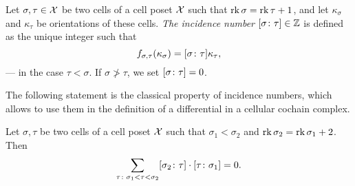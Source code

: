 \begin{defin}\label{definIncidenceNumber}
Let $\sigma,\tau\in \mathcal{X}$ be two cells of a cell poset $\mathcal{X}$ such that $\operatorname{rk}\sigma=\operatorname{rk}\tau+1$, and let $\kappa_\sigma$ and $\kappa_\tau$ be orientations of these cells. \emph{The incidence number} $[\sigma\colon \tau]\in\mathbb{Z}$ is defined as the unique integer such that
\[
f_{\sigma,\tau}(\kappa_\sigma)=[\sigma\colon \tau]\kappa_\tau,
\]
--- in the case $\tau<\sigma$. If $\sigma\ngtr \tau$, we set $[\sigma\colon \tau]=0$.
\end{defin}

The following statement is the classical property of incidence numbers, which allows to use them in the definition of a differential in a cellular cochain complex.

\begin{lem}\label{lemDiamondProperty}
Let $\sigma,\tau$ be two cells of a cell poset $\mathcal{X}$ such that $\sigma_1<\sigma_2$ and $\operatorname{rk}\sigma_2=\operatorname{rk}\sigma_1+2$. Then
\begin{equation}\label{eqDiamond}
\sum_{\tau\colon \sigma_1<\tau<\sigma_2}[\sigma_2\colon \tau]\cdot[\tau\colon \sigma_1]=0.
\end{equation}
\end{lem}

